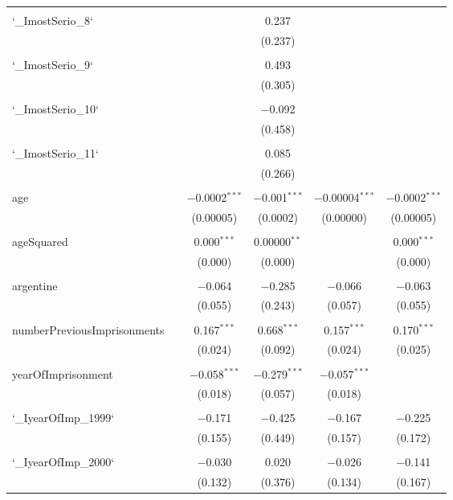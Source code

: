 \documentclass{article}
\begin{document}
\begin{table}[!htbp]
{\begin{tabular}{@{\extracolsep{5pt}}lccccc}
  & & & & & \\ 
 `\_ImostSerio\_8` &  &  & 0.237 &  &  \\ 
  &  &  & (0.237) &  &  \\ 
  & & & & & \\ 
 `\_ImostSerio\_9` &  &  & 0.493 &  &  \\ 
  &  &  & (0.305) &  &  \\ 
  & & & & & \\ 
 `\_ImostSerio\_10` &  &  & $-$0.092 &  &  \\ 
  &  &  & (0.458) &  &  \\ 
  & & & & & \\ 
 `\_ImostSerio\_11` &  &  & 0.085 &  &  \\ 
  &  &  & (0.266) &  &  \\ 
  & & & & & \\ 
 age &  & $-$0.0002$^{***}$ & $-$0.001$^{***}$ & $-$0.00004$^{***}$ & $-$0.0002$^{***}$ \\ 
  &  & (0.00005) & (0.0002) & (0.00000) & (0.00005) \\ 
  & & & & & \\ 
 ageSquared &  & 0.000$^{***}$ & 0.00000$^{**}$ &  & 0.000$^{***}$ \\ 
  &  & (0.000) & (0.000) &  & (0.000) \\ 
  & & & & & \\ 
 argentine &  & $-$0.064 & $-$0.285 & $-$0.066 & $-$0.063 \\ 
  &  & (0.055) & (0.243) & (0.057) & (0.055) \\ 
  & & & & & \\ 
 numberPreviousImprisonments &  & 0.167$^{***}$ & 0.668$^{***}$ & 0.157$^{***}$ & 0.170$^{***}$ \\ 
  &  & (0.024) & (0.092) & (0.024) & (0.025) \\ 
  & & & & & \\ 
 yearOfImprisonment &  & $-$0.058$^{***}$ & $-$0.279$^{***}$ & $-$0.057$^{***}$ &  \\ 
  &  & (0.018) & (0.057) & (0.018) &  \\ 
  & & & & & \\ 
 `\_IyearOfImp\_1999` &  & $-$0.171 & $-$0.425 & $-$0.167 & $-$0.225 \\ 
  &  & (0.155) & (0.449) & (0.157) & (0.172) \\ 
  & & & & & \\ 
 `\_IyearOfImp\_2000` &  & $-$0.030 & 0.020 & $-$0.026 & $-$0.141 \\ 
  &  & (0.132) & (0.376) & (0.134) & (0.167) \\ 

\end{tabular}}
\end{table}
\end{document}
